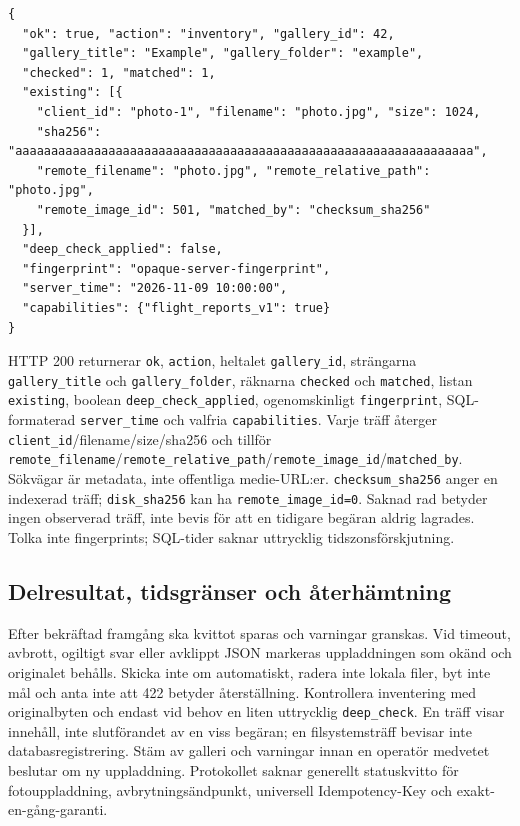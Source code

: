 \documentclass[11pt,a4paper]{article}
\newcommand{\codeword}[1]{\nolinkurl{#1}}
\begin{document}
\begin{lstlisting}[language={}]
{
  "ok": true, "action": "inventory", "gallery_id": 42,
  "gallery_title": "Example", "gallery_folder": "example",
  "checked": 1, "matched": 1,
  "existing": [{
    "client_id": "photo-1", "filename": "photo.jpg", "size": 1024,
    "sha256": "aaaaaaaaaaaaaaaaaaaaaaaaaaaaaaaaaaaaaaaaaaaaaaaaaaaaaaaaaaaaaaaa",
    "remote_filename": "photo.jpg", "remote_relative_path": "photo.jpg",
    "remote_image_id": 501, "matched_by": "checksum_sha256"
  }],
  "deep_check_applied": false,
  "fingerprint": "opaque-server-fingerprint",
  "server_time": "2026-11-09 10:00:00",
  "capabilities": {"flight_reports_v1": true}
}
\end{lstlisting}

HTTP 200 returnerar \codeword{ok}, \codeword{action}, heltalet \codeword{gallery_id},
strängarna \codeword{gallery_title} och \codeword{gallery_folder}, räknarna
\codeword{checked} och \codeword{matched}, listan \codeword{existing}, boolean
\codeword{deep_check_applied}, ogenomskinligt \codeword{fingerprint}, SQL-formaterad
\codeword{server_time} och valfria \codeword{capabilities}. Varje träff återger
\codeword{client_id}/filename/size/sha256 och tillför
\codeword{remote_filename}/\codeword{remote_relative_path}/\codeword{remote_image_id}/\codeword{matched_by}.
Sökvägar är metadata, inte offentliga medie-URL:er. \codeword{checksum_sha256} anger en
indexerad träff; \codeword{disk_sha256} kan ha \codeword{remote_image_id=0}. Saknad rad
betyder ingen observerad träff, inte bevis för att en tidigare begäran aldrig lagrades.
Tolka inte fingerprints; SQL-tider saknar uttrycklig tidszonsförskjutning.

\subsection{\texorpdfstring{Delresultat, tidsgränser och återhämtning}{Delresultat, tidsgränser och återhämtning}}

\label{api352:recovery}

Efter bekräftad framgång ska kvittot sparas och varningar granskas. Vid timeout, avbrott,
ogiltigt svar eller avklippt JSON markeras uppladdningen som okänd och originalet behålls.
Skicka inte om automatiskt, radera inte lokala filer, byt inte mål och anta inte att 422
betyder återställning. Kontrollera inventering med originalbyten och endast vid behov en
liten uttrycklig \codeword{deep_check}. En träff visar innehåll, inte slutförandet av en
viss begäran; en filsystemsträff bevisar inte databasregistrering. Stäm av galleri och
varningar innan en operatör medvetet beslutar om ny uppladdning. Protokollet saknar
generellt statuskvitto för fotouppladdning, avbrytningsändpunkt, universell Idempotency-Key
och exakt-en-gång-garanti.
\end{document}

